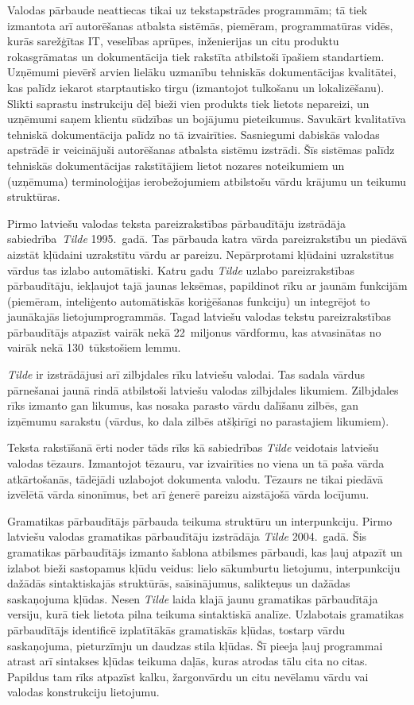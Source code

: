 \begin{multicols}{2}
Valodas pārbaude neattiecas tikai uz tekstapstrādes programmām; tā tiek izmantota arī autorēšanas atbalsta sistēmās, piemēram, programmatūras vidēs, kurās sarežģītas IT, veselības aprūpes, inženierijas un citu produktu rokasgrāmatas un dokumentācija tiek rakstīta atbilstoši īpašiem standartiem.
Uzņēmumi pievērš arvien lielāku uzmanību tehniskās dokumentācijas kvalitātei, kas palīdz iekarot starptautisko tirgu (izmantojot tulkošanu un lokalizēšanu).
Slikti saprastu instrukciju dēļ bieži vien produkts tiek lietots nepareizi, un uzņēmumi saņem klientu sūdzības un bojājumu pieteikumus.
Savukārt kvalitatīva tehniskā dokumentācija palīdz no tā izvairīties.
Sasniegumi dabiskās valodas apstrādē ir veicinājuši autorēšanas atbalsta sistēmu izstrādi.
Šīs sistēmas palīdz tehniskās dokumentācijas rakstītājiem lietot nozares noteikumiem un (uzņēmuma) terminoloģijas ierobežojumiem atbilstošu vārdu krājumu un teikumu struktūras.

Pirmo latviešu valodas teksta pareizrakstības pārbaudītāju izstrādāja sabiedrība~\textit{Tilde} 1995.~gadā.
Tas pārbauda katra vārda pareizrakstību un piedāvā aizstāt kļūdaini uzrakstītu vārdu ar pareizu.
Nepārprotami kļūdaini uzrakstītus vārdus tas izlabo automātiski.
Katru gadu \textit{Tilde} uzlabo pareizrakstības pārbaudītāju, iekļaujot tajā jaunas leksēmas, papildinot rīku ar jaunām funkcijām (piemēram, inteliģento automātiskās koriģēšanas funkciju) un integrējot to jaunākajās lietojumprogrammās.
Tagad latviešu valodas tekstu pareizrakstības pārbaudītājs atpazīst vairāk nekā 22~miljonus vārdformu, kas atvasinātas no vairāk nekā 130~tūkstošiem lemmu.

\textit{Tilde} ir izstrādājusi arī zilbjdales rīku latviešu valodai.
Tas sadala vārdus pārnešanai jaunā rindā atbilstoši latviešu valodas zilbjdales likumiem.
Zilbjdales rīks izmanto gan likumus, kas nosaka parasto vārdu dalīšanu zilbēs, gan izņēmumu sarakstu (vārdus, ko dala zilbēs atšķirīgi no parastajiem likumiem). 

Teksta rakstīšanā ērti noder tāds rīks kā sabiedrības \textit{Tilde} veidotais latviešu valodas tēzaurs.
Izmantojot tēzauru, var izvairīties no viena un tā paša vārda atkārtošanās, tādējādi uzlabojot dokumenta valodu.
Tēzaurs ne tikai piedāvā izvēlētā vārda sinonīmus, bet arī ģenerē pareizu aizstājošā vārda locījumu. 

Gramatikas pārbaudītājs pārbauda teikuma struktūru un interpunkciju.
Pirmo latviešu valodas gramatikas pārbaudītāju izstrādāja \textit{Tilde }2004.~gadā.
Šis gramatikas pārbaudītājs izmanto šablona atbilsmes pārbaudi, kas ļauj atpazīt un izlabot bieži sastopamus kļūdu veidus: lielo sākumburtu lietojumu, interpunkciju dažādās sintaktiskajās struktūrās, saīsinājumus, salikteņus un dažādas saskaņojuma kļūdas.
Nesen \textit{Tilde} laida klajā jaunu gramatikas pārbaudītāja versiju, kurā tiek lietota pilna teikuma sintaktiskā analīze.
Uzlabotais gramatikas pārbaudītājs identificē izplatītākās gramatiskās kļūdas, tostarp vārdu saskaņojuma, pieturzīmju un daudzas stila kļūdas.
Šī pieeja ļauj programmai atrast arī sintakses kļūdas teikuma daļās, kuras atrodas tālu cita no citas.
Papildus tam rīks atpazīst kalku, žargonvārdu un citu nevēlamu vārdu vai valodas konstrukciju lietojumu.


\end{multicols}
